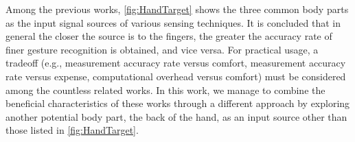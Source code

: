 \documentclass{sigchi}
\begin{document}
Among the previous works, \autoref{fig:HandTarget} shows the three common body parts as the input signal sources of various sensing techniques. It is concluded that in general the closer the source is to the fingers, the greater the accuracy rate of finer gesture recognition is obtained, and vice versa. For practical usage, a tradeoff (e.g., measurement accuracy rate versus comfort, measurement accuracy rate versus expense, computational overhead versus comfort) must be considered among the countless related works. In this work, we manage to combine the beneficial characteristics of these works through a different approach by exploring another potential body part, the back of the hand, as an input source other than those listed in \autoref{fig:HandTarget}.



\end{document}
